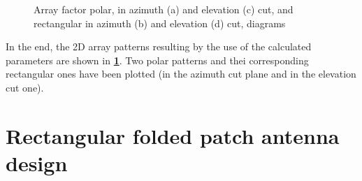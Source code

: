 \documentclass[10 pt,a4paper,twocolumn]{article}
\begin{document}
{\begin{figure}[bt!]
\centering
	\begin{subfigure}[t]{0.35\linewidth}
		\def\svgwidth{\linewidth}
		\tiny{}
		\caption{}
	\end{subfigure}
\hspace{0.05\linewidth}
	\begin{subfigure}[t]{0.45\linewidth}
		\def\svgwidth{\linewidth}
		\tiny{}
		\caption{}
	\end{subfigure}

	\begin{subfigure}[t]{0.35\linewidth}
		\def\svgwidth{\linewidth}
		\tiny{}
		\caption{}
	\end{subfigure}\hspace{0.05\linewidth}
	\begin{subfigure}[t]{0.45\linewidth}
		\def\svgwidth{\linewidth}
		\tiny{}
		\caption{}
	\end{subfigure}

	\caption{{Array factor polar, in azimuth (a) and elevation (c) cut, and rectangular  in azimuth (b) and elevation (d) cut, diagrams}}
	\label{fig:array factor}
\end{figure}


\indent

In the end, the 2D array patterns resulting by the use of the calculated parameters are shown in \textbf{\cref{fig:array factor}}. Two polar patterns and thei corresponding rectangular ones have been plotted (in the azimuth cut plane and in the elevation cut one). 





\section*{Rectangular folded patch 	
	antenna design}

}
\end{document}
